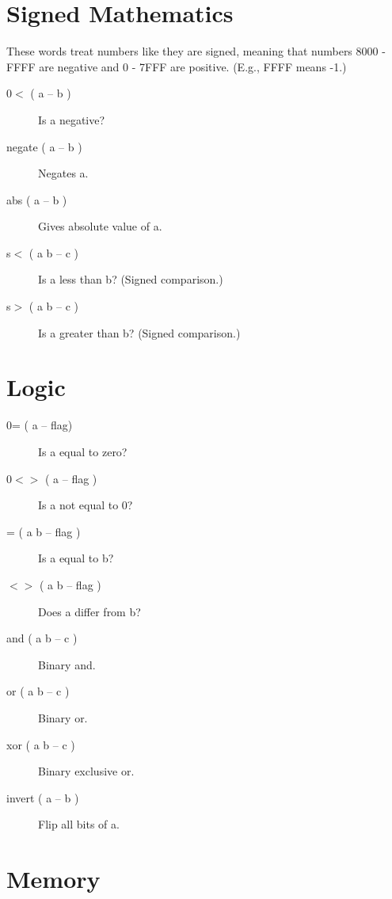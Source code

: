 \section{Signed Mathematics}

These words treat numbers like they are signed, meaning that numbers 8000 - FFFF are negative
and 0 - 7FFF are positive. (E.g., FFFF means -1.)

\begin{description}
\item[0$<$ ( a -- b )] Is a negative?
\item[negate ( a -- b )] Negates a.
\item[abs ( a -- b )] Gives absolute value of a.
\item[s$<$ ( a b -- c )] Is a less than b? (Signed comparison.)
\item[s$>$ ( a b -- c )] Is a greater than b? (Signed comparison.)
\end{description}

\section{Logic}

\begin{description}
\item[0= ( a -- flag)] Is a equal to zero?
\item[0$<>$ ( a -- flag )] Is a not equal to 0?
\item[= ( a b -- flag )] Is a equal to b?
\item[$<>$ ( a b -- flag )] Does a differ from b?
\item[and ( a b -- c )] Binary and.  
\item[or ( a b -- c )] Binary or.  
\item[xor ( a b -- c )] Binary exclusive or.  
\item[invert ( a -- b )] Flip all bits of a.  
\end{description}

\section{Memory}

